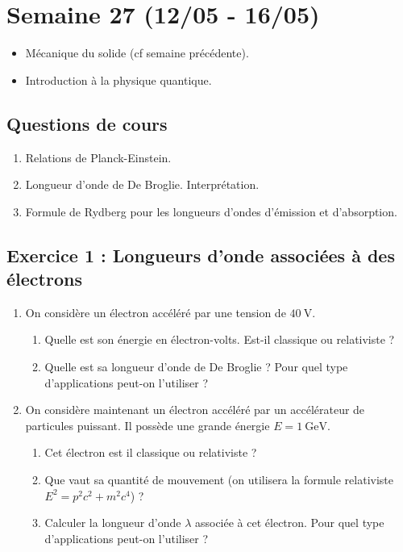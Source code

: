 \section{Semaine 27 (12/05 - 16/05) }


\begin{itemize}
	\item Mécanique du solide (cf semaine précédente).
	\item Introduction à la physique quantique.
\end{itemize}

\subsection{Questions de cours}

\begin{enumerate}
	\item Relations de Planck-Einstein.
	\item Longueur d'onde de De Broglie. Interprétation.
	\item Formule de Rydberg pour les longueurs d'ondes d'émission et d'absorption.
\end{enumerate}

\subsection{Exercice 1 : Longueurs d'onde associées à des électrons}

\begin{enumerate}
	\item On considère un électron accéléré par une tension de $\SI{40}{\volt}$.
	\begin{enumerate}
		\item Quelle est son énergie en électron-volts. Est-il classique ou relativiste ?
		\item Quelle est sa longueur d'onde de De Broglie ? Pour quel type d'applications peut-on l'utiliser ?
	\end{enumerate}
	
	\item On considère maintenant un électron accéléré par un accélérateur de particules puissant. Il possède une grande énergie $E = \SI{1}{\giga\electronvolt}$. 
	\begin{enumerate}
		\item Cet électron est il classique ou relativiste ?
		\item Que vaut sa quantité de mouvement (on utilisera la formule relativiste $E^2 = p^2c^2+m^2c^4$) ?
		\item Calculer la longueur d'onde $\lambda$ associée à cet électron. Pour quel type d'applications peut-on l'utiliser ?
	\end{enumerate}  
\end{enumerate}


